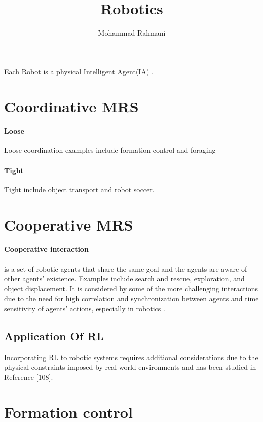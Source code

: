 \documentclass{article}
\begin{document}
	
	\title{Robotics}
	\author{Mohammad Rahmani}
	\date{}
	\maketitle
	Each Robot is a physical Intelligent Agent(IA) \citep{rizk-2018-decision-making-in-multiagent-systems-a-survey}.  
	\section{Coordinative MRS}
		\paragraph{Loose}
		Loose coordination examples include formation control and foraging
		\paragraph{Tight}
		Tight include object transport and robot soccer.
	\section{Cooperative MRS}
		\paragraph{Cooperative interaction}  is a set of robotic agents that share the same goal and the agents are aware of other agents’ existence. Examples include search and rescue, exploration, and object  displacement\citep{rizk-2018-decision-making-in-multiagent-systems-a-survey}. It is considered
		by some of the more challenging interactions due to the need for high correlation and synchronization between agents
		and time sensitivity of agents’ actions, especially in robotics  \citep{rizk-2018-decision-making-in-multiagent-systems-a-survey}. 
		\subsection{Application Of RL} Incorporating RL to robotic systems requires additional considerations due to
		the physical constraints imposed by real-world environments and has been studied in Reference
		\citet{rizk-2019-cooperative-heterogeneous-multi-robot-systems-a-survey}[108].
		 
    \section{Formation control}
\end{document}
